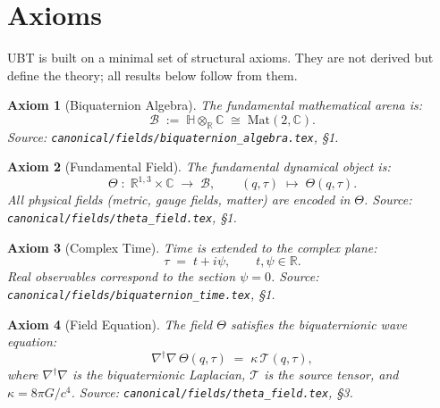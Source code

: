 \documentclass[12pt,a4paper]{article}
\newtheorem{axiom}{Axiom}
\begin{document}
\section{Axioms}
\label{sec:axioms}

UBT is built on a minimal set of structural axioms.  They are not derived
but define the theory; all results below follow from them.

\begin{axiom}[Biquaternion Algebra]\label{ax:algebra}
The fundamental mathematical arena is:
\begin{equation}
  \mathcal{B} \;:=\; \mathbb{H}\otimes_{\mathbb{R}}\mathbb{C}
  \;\cong\; \mathrm{Mat}(2,\mathbb{C}).
\end{equation}
\textit{Source}: \texttt{canonical/fields/biquaternion\_algebra.tex}, \S1.
\end{axiom}

\begin{axiom}[Fundamental Field]\label{ax:field}
The fundamental dynamical object is:
\begin{equation}
  \Theta \;:\; \mathbb{R}^{1,3}\times\mathbb{C} \;\to\; \mathcal{B},
  \qquad (q,\tau) \;\mapsto\; \Theta(q,\tau).
\end{equation}
All physical fields (metric, gauge fields, matter) are encoded in $\Theta$.
\textit{Source}: \texttt{canonical/fields/theta\_field.tex}, \S1.
\end{axiom}

\begin{axiom}[Complex Time]\label{ax:time}
Time is extended to the complex plane:
\begin{equation}
  \tau \;=\; t + i\psi, \qquad t,\psi\in\mathbb{R}.
\end{equation}
Real observables correspond to the section $\psi = 0$.
\textit{Source}: \texttt{canonical/fields/biquaternion\_time.tex}, \S1.
\end{axiom}

\begin{axiom}[Field Equation]\label{ax:eq}
The field $\Theta$ satisfies the biquaternionic wave equation:
\begin{equation}\label{eq:tshirt}
  \boxed{\nabla^\dagger\nabla\,\Theta(q,\tau) \;=\; \kappa\,\mathcal{T}(q,\tau),}
\end{equation}
where $\nabla^\dagger\nabla$ is the biquaternionic Laplacian,
$\mathcal{T}$ is the source tensor, and $\kappa = 8\pi G/c^4$.
\textit{Source}: \texttt{canonical/fields/theta\_field.tex}, \S3.
\end{axiom}
\end{document}

